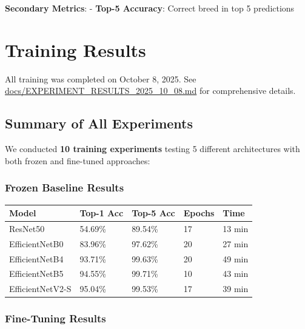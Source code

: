 \documentclass[
  letterpaper,
  DIV=11,
  numbers=noendperiod]{scrartcl}
\begin{document}
\textbf{Secondary Metrics}: - \textbf{Top-5 Accuracy}: Correct breed in
top 5 predictions

\section{Training Results}\label{training-results}

All training was completed on October 8, 2025. See
\href{../docs/EXPERIMENT_RESULTS_2025_10_08.md}{docs/EXPERIMENT\_RESULTS\_2025\_10\_08.md}
for comprehensive details.

\subsection{Summary of All
Experiments}\label{summary-of-all-experiments}

We conducted \textbf{10 training experiments} testing 5 different
architectures with both frozen and fine-tuned approaches:

\subsubsection{Frozen Baseline Results}\label{frozen-baseline-results}

\begin{longtable}[]{@{}lllll@{}}
\toprule\noalign{}
Model & Top-1 Acc & Top-5 Acc & Epochs & Time \\
\midrule\noalign{}
\endhead
\bottomrule\noalign{}
\endlastfoot
ResNet50 & 54.69\% & 89.54\% & 17 & 13 min \\
EfficientNetB0 & 83.96\% & 97.62\% & 20 & 27 min \\
EfficientNetB4 & 93.71\% & 99.63\% & 20 & 49 min \\
EfficientNetB5 & 94.55\% & 99.71\% & 10 & 43 min \\
EfficientNetV2-S & 95.04\% & 99.53\% & 17 & 39 min \\
\end{longtable}

\subsubsection{Fine-Tuning Results}\label{fine-tuning-results}
\end{document}
